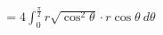 \documentclass[preview]{standalone}
\begin{document}
\begin{align*}
=4\int_{0}^{\frac{\pi}{2}}r\sqrt{\cos^{2}\theta}\cdot r\cos\theta\ d\theta
\end{align*}
\end{document}
